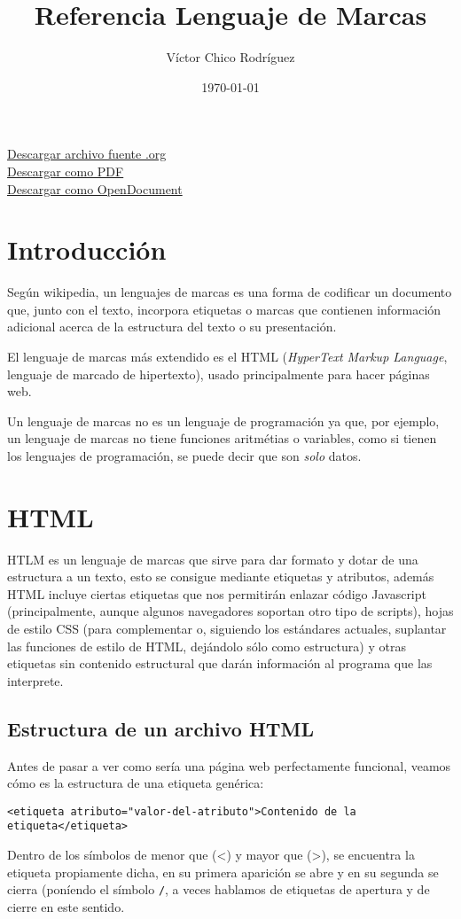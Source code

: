 \documentclass[11pt]{article}
\author{Víctor Chico Rodríguez}
\date{\today}
\title{Referencia Lenguaje de Marcas}
\begin{document}
\maketitle
\tableofcontents

\href{./referencia.org}{Descargar archivo fuente .org}\\
\href{./referencia.pdf}{Descargar como PDF}\\
\href{./referencia.odt}{Descargar como OpenDocument}

\section{Introducción}
\label{sec:org656268d}
Según wikipedia, un lenguajes de marcas es una forma de codificar un documento que, junto con el texto, incorpora etiquetas o marcas que contienen información adicional acerca de la estructura del texto o su presentación.

El lenguaje de marcas más extendido es el HTML (\emph{HyperText Markup Language}, lenguaje de marcado de hipertexto), usado principalmente para hacer páginas web.

Un lenguaje de marcas no es un lenguaje de programación ya que, por ejemplo, un lenguaje de marcas no tiene funciones aritmétias o variables, como si tienen los lenguajes de programación, se puede decir que son \emph{solo} datos.
\section{HTML}
\label{sec:org0891ed8}
HTLM es un lenguaje de marcas que sirve para dar formato y dotar de una estructura a un texto, esto se consigue mediante etiquetas y atributos, además HTML incluye ciertas etiquetas que nos permitirán enlazar código Javascript (principalmente, aunque algunos navegadores soportan otro tipo de scripts), hojas de estilo CSS (para complementar o, siguiendo los estándares actuales, suplantar las funciones de estilo de HTML, dejándolo sólo como estructura) y otras etiquetas sin contenido estructural que darán información al programa que las interprete.
\subsection{Estructura de un archivo HTML}
\label{sec:orga714ba3}
Antes de pasar a ver como sería una página web perfectamente funcional, veamos cómo es la estructura de una etiqueta genérica:

\begin{verbatim}
<etiqueta atributo="valor-del-atributo">Contenido de la etiqueta</etiqueta>
\end{verbatim}
Dentro de los símbolos de menor que (<) y mayor que (>), se encuentra la etiqueta propiamente dicha, en su primera aparición se abre y en su segunda se cierra (poníendo el símbolo \texttt{/}, a veces hablamos de etiquetas de apertura y de cierre en este sentido.
\end{document}
